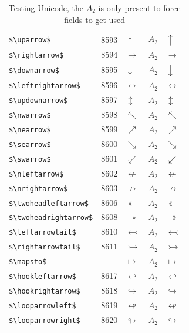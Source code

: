 ﻿\documentclass{article}
\begin{document}
\begin{table}
\begin{center}
\begin{tabular}{llll}
 \verb#$\uparrow$#           & 8593 & $\uparrow$           & $A_2\quad \uparrow$\\
 \verb#$\rightarrow$#        & 8594 & $\rightarrow$        & $A_2\quad \rightarrow$\\
 \verb#$\downarrow$#         & 8595 & $\downarrow$         & $A_2\quad \downarrow$\\
 \verb#$\leftrightarrow$#    & 8596 & $\leftrightarrow$    & $A_2\quad \leftrightarrow$\\
 \verb#$\updownarrow$#       & 8597 & $\updownarrow$       & $A_2\quad \updownarrow$\\
 \verb#$\nwarrow$#           & 8598 & $\nwarrow$           & $A_2\quad \nwarrow$\\
 \verb#$\nearrow$#           & 8599 & $\nearrow$           & $A_2\quad \nearrow$\\
 \verb#$\searrow$#           & 8600 & $\searrow$           & $A_2\quad \searrow$\\
 \verb#$\swarrow$#           & 8601 & $\swarrow$           & $A_2\quad \swarrow$\\
 \verb#$\nleftarrow$#        & 8602 & $\nleftarrow$        & $A_2\quad \nleftarrow$\\
 \verb#$\nrightarrow$#       & 8603 & $\nrightarrow$       & $A_2\quad \nrightarrow$\\
 \verb#$\twoheadleftarrow$#  & 8606 & $\twoheadleftarrow$  & $A_2\quad \twoheadleftarrow$\\
 \verb#$\twoheadrightarrow$# & 8608 & $\twoheadrightarrow$ & $A_2\quad \twoheadrightarrow$\\
 \verb#$\leftarrowtail$#     & 8610 & $\leftarrowtail$     & $A_2\quad \leftarrowtail$\\
 \verb#$\rightarrowtail$#    & 8611 & $\rightarrowtail$    & $A_2\quad \rightarrowtail$\\
 \verb#$\mapsto$#            &      & $\mapsto$            & $A_2\quad \mapsto$\\
 \verb#$\hookleftarrow$#     & 8617 & $\hookleftarrow$     & $A_2\quad \hookleftarrow$\\
 \verb#$\hookrightarrow$#    & 8618 & $\hookrightarrow$    & $A_2\quad \hookrightarrow$\\
 \verb#$\looparrowleft$#     & 8619 & $\looparrowleft$     & $A_2\quad \looparrowleft$\\
 \verb#$\looparrowright$#    & 8620 & $\looparrowright$    & $A_2\quad \looparrowright$\\
\end{tabular}
\end{center}
\caption{Testing Unicode, the $A_2$ is only present to force fields to get used}
\end{table}
\end{document}
